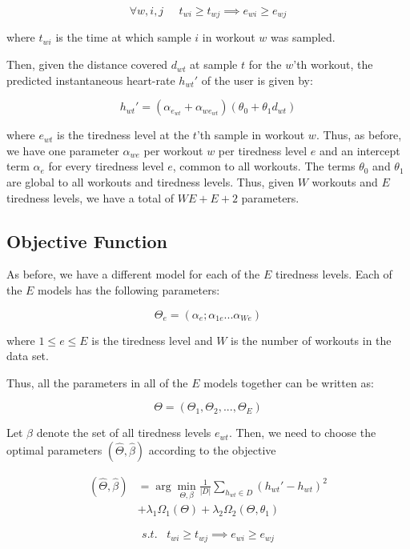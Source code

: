 \documentclass{acm_proc_article-sp}
\begin{document}
$$\forall w,i,j \;\;\;\;\; t_{wi} \geq t_{wj} \implies e_{wi} \geq e_{wj}$$

where $t_{wi}$ is the time at which sample $i$ in workout $w$ was sampled.

Then, given the distance covered $d_{wt}$ at sample $t$ for the $w$'th workout, the predicted instantaneous heart-rate $h_{wt}'$ of the user is given by:

\begin{equation}
\label{eqnModelInstHr}
h_{wt}' = (\alpha_{e_{wt}} + \alpha_{we_{wt}})(\theta_0 + \theta_1 d_{wt})
\end{equation}

where $e_{wt}$ is the tiredness level at the $t$'th sample in workout $w$. Thus, as before, we have one parameter $\alpha_{we}$ per workout $w$ per tiredness level $e$ and an intercept term $\alpha_e$ for every tiredness level $e$, common to all workouts. The terms $\theta_0$ and $\theta_1$ are global to all workouts and tiredness levels. Thus, given $W$ workouts and $E$ tiredness levels, we have a total of $WE + E + 2$ parameters.

\subsection{Objective Function}
As before, we have a different model for each of the $E$ tiredness levels. Each of the $E$ models has the following parameters:

$$\Theta_e = (\alpha_e; \alpha_{1e}...\alpha_{We})$$

where $1 \leq e \leq E$ is the tiredness level and $W$ is the number of workouts in the data set.

Thus, all the parameters in all of the $E$ models together can be written as:

$$\Theta = (\Theta_1, \Theta_2,..., \Theta_E)$$

Let $\beta$ denote the set of all tiredness levels $e_{wt}$. Then, we need to choose the optimal parameters $(\hat{\Theta}, \hat{\beta})$ according to the objective

\begin{align}
\label{eqnObjective2}
(\hat{\Theta}, \hat{\beta})  &= \arg\min_{\Theta,\beta}\frac{1}{|D|} \sum_{h_{wt} \in D}(h_{wt}' - h_{wt})^2 \nonumber \\
 & + \lambda_1\Omega_1(\Theta) + \lambda_2\Omega_2(\Theta, \theta_1)
\end{align}

$$s.t. \; \; \; t_{wi} \geq t_{wj} \implies e_{wi} \geq e_{wj} $$
\end{document}
